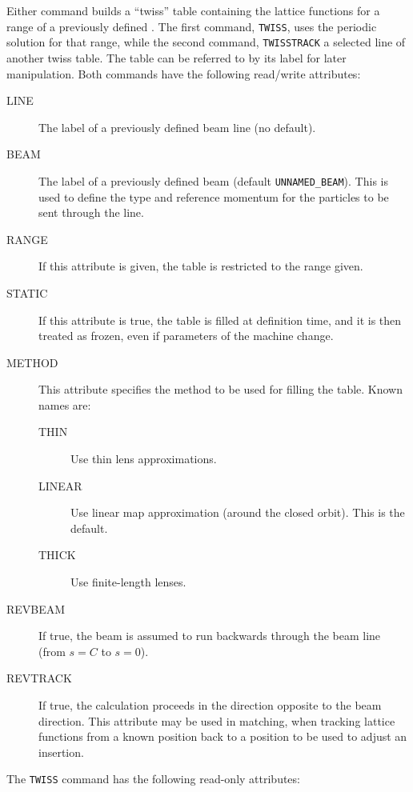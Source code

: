 Either command builds a ``twiss'' table containing the lattice functions for
a range of a previously defined .
The first command, \texttt{TWISS}, uses the periodic solution for that
range, while the second command, \texttt{TWISSTRACK} a selected line
of another twiss table.
The table can be referred to by its label for later manipulation.
Both commands have the following read/write attributes:
\begin{description}
\item[LINE]
  The label of a previously defined beam line (no default).
\item[BEAM]
  The label of a previously defined beam (default \texttt{UNNAMED\_BEAM}).
  This is used to define the type and reference momentum for the
  particles to be sent through the line.
\item[RANGE]
  If this attribute is given, the table is restricted to the range given.
\item[STATIC]
  If this attribute is true, the table is filled at definition time,
  and it is then treated as frozen, even if parameters of the machine change.
\item[METHOD]
  This attribute specifies the method to be used for filling the table.
  Known names are:
  \begin{description}
  \item[THIN]
    Use thin lens approximations.
  \item[LINEAR]
    Use linear map approximation (around the closed orbit).
    This is the default.
  \item[THICK]
    Use finite-length lenses.
  \end{description}
\item[REVBEAM]
  If true, the beam is assumed to run backwards through the beam line
  (from $s=C$ to $s=0$).
\item[REVTRACK]
  If true, the calculation proceeds in the direction opposite to the beam
  direction.
  This attribute may be used in matching, when tracking lattice
  functions from a known position back to a position to be used to
  adjust an insertion.
\end{description}
The \texttt{TWISS} command has the following read-only attributes:

